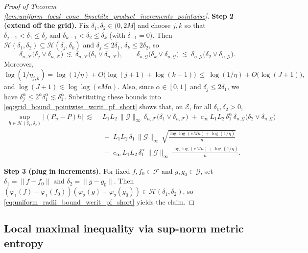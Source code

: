 \documentclass[11pt]{article}
\theoremstyle{plain}
\theoremstyle{definition} %
\begin{document}
\begin{proof}[Proof of Theorem \ref{lem:uniform_local_conc_lipschitz_product_increments_pointwise}]
\medskip
\noindent\textbf{Step 2 (extend off the grid).}
Fix $\delta_1,\delta_2\in(0,2M]$ and choose $j,k$ so that
$\delta_{j-1}<\delta_1\le \delta_j$ and $\delta_{k-1}<\delta_2\le \delta_k$ (with $\delta_{-1}=0$).
Then $\mathcal H(\delta_1,\delta_2)\subseteq \mathcal H(\delta_j,\delta_k)$ and $\delta_j\le 2\delta_1$, $\delta_k\le 2\delta_2$, so
\[
\delta_{n,\mathcal F}\bigl(\delta_j\vee \delta_{n,\mathcal F}\bigr)
\ \lesssim\
\delta_{n,\mathcal F}\bigl(\delta_1\vee \delta_{n,\mathcal F}\bigr),
\qquad
\delta_{n,\mathcal G}\bigl(\delta_k\vee \delta_{n,\mathcal G}\bigr)
\ \lesssim\
\delta_{n,\mathcal G}\bigl(\delta_2\vee \delta_{n,\mathcal G}\bigr).
\]
Moreover,
\[
\log(1/\eta_{j,k})
=
\log(1/\eta)+O\bigl(\log(j+1)+\log(k+1)\bigr)
\ \le\
\log(1/\eta)+O\bigl(\log(J+1)\bigr),
\]
and $\log(J+1)\lesssim \log\log(eMn)$. Also, since $\alpha\in[0,1]$ and $\delta_j\le 2\delta_1$, we have $\delta_j^\alpha\le 2^\alpha \delta_1^\alpha\lesssim \delta_1^\alpha$. Substituting these bounds into
\eqref{eq:grid_bound_pointwise_wcrit_pf_short} shows that, on $\mathcal E$, for all $\delta_1,\delta_2>0$,
\begin{align}
\label{eq:uniform_radii_bound_wcrit_pf_short}
\sup_{h\in\mathcal H(\delta_1,\delta_2)} |(P_n-P)h|
\ \lesssim\
&\ L_1L_2\,\|\mathcal G\|_\infty \,
\delta_{n,\mathcal F}\bigl(\delta_{1}\vee \delta_{n,\mathcal F}\bigr)
\;+\;
c_\infty\,L_1L_2\,\delta_{1}^{\alpha}\,
\delta_{n,\mathcal G}\bigl(\delta_{2}\vee \delta_{n,\mathcal G}\bigr)\nonumber\\
&\;+\;
L_1L_2\,\delta_{1}\,\|\mathcal G\|_\infty\,
\sqrt{\frac{\log\log(eMn)+\log(1/\eta)}{n}}\\
&\;+\;
c_\infty\,L_1L_2\,\delta_{1}^{\alpha}\,\|\mathcal G\|_\infty\,
\frac{\log\log(eMn)+\log(1/\eta)}{n}.
\end{align}

\medskip
\noindent\textbf{Step 3 (plug in increments).}
For fixed $f,f_0\in\mathcal F$ and $g,g_0\in\mathcal G$, set $\delta_1=\|f-f_0\|$ and $\delta_2=\|g-g_0\|$.
Then $(\varphi_1(f)-\varphi_1(f_0))(\varphi_2(g)-\varphi_2(g_0))\in\mathcal H(\delta_1,\delta_2)$, so
\eqref{eq:uniform_radii_bound_wcrit_pf_short} yields the claim.
\end{proof}




\subsection{Local maximal inequality via sup-norm metric entropy}
 \label{sec::innerproductentropy}
\end{document}
